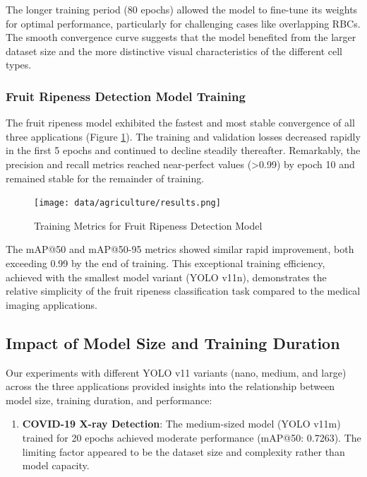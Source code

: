 \begin{multicols}{2}
The longer training period (80 epochs) allowed the model to fine-tune its weights for optimal performance, particularly for challenging cases like overlapping RBCs. The smooth convergence curve suggests that the model benefited from the larger dataset size and the more distinctive visual characteristics of the different cell types.

\subsubsection{Fruit Ripeness Detection Model Training}

The fruit ripeness model exhibited the fastest and most stable convergence of all three applications (Figure \ref{fig:fruit_training}). The training and validation losses decreased rapidly in the first 5 epochs and continued to decline steadily thereafter. Remarkably, the precision and recall metrics reached near-perfect values (>0.99) by epoch 10 and remained stable for the remainder of training.

\begin{figure}[h]
\centering
\texttt{[image: data/agriculture/results.png]}
\caption{Training Metrics for Fruit Ripeness Detection Model}
\label{fig:fruit_training}
\end{figure}

The mAP@50 and mAP@50-95 metrics showed similar rapid improvement, both exceeding 0.99 by the end of training. This exceptional training efficiency, achieved with the smallest model variant (YOLO v11n), demonstrates the relative simplicity of the fruit ripeness classification task compared to the medical imaging applications.

\subsection{Impact of Model Size and Training Duration}

Our experiments with different YOLO v11 variants (nano, medium, and large) across the three applications provided insights into the relationship between model size, training duration, and performance:

\begin{enumerate}
    \item \textbf{COVID-19 X-ray Detection}: The medium-sized model (YOLO v11m) trained for 20 epochs achieved moderate performance (mAP@50: 0.7263). The limiting factor appeared to be the dataset size and complexity rather than model capacity.
    

\end{enumerate}
\end{multicols}
